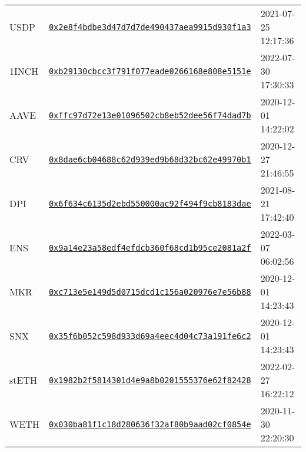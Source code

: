 \begin{tabular}{lll}
 USDP & \href{https://etherscan.io/address/0x2e8f4bdbe3d47d7d7de490437aea9915d930f1a3}{\tt 0x2e8f4bdbe3d47d7d7de490437aea9915d930f1a3} &      2021-07-25 12:17:36 \\
1INCH & \href{https://etherscan.io/address/0xb29130cbcc3f791f077eade0266168e808e5151e}{\tt 0xb29130cbcc3f791f077eade0266168e808e5151e} &      2022-07-30 17:30:33 \\
 AAVE & \href{https://etherscan.io/address/0xffc97d72e13e01096502cb8eb52dee56f74dad7b}{\tt 0xffc97d72e13e01096502cb8eb52dee56f74dad7b} &      2020-12-01 14:22:02 \\
  CRV & \href{https://etherscan.io/address/0x8dae6cb04688c62d939ed9b68d32bc62e49970b1}{\tt 0x8dae6cb04688c62d939ed9b68d32bc62e49970b1} &      2020-12-27 21:46:55 \\
  DPI & \href{https://etherscan.io/address/0x6f634c6135d2ebd550000ac92f494f9cb8183dae}{\tt 0x6f634c6135d2ebd550000ac92f494f9cb8183dae} &      2021-08-21 17:42:40 \\
  ENS & \href{https://etherscan.io/address/0x9a14e23a58edf4efdcb360f68cd1b95ce2081a2f}{\tt 0x9a14e23a58edf4efdcb360f68cd1b95ce2081a2f} &      2022-03-07 06:02:56 \\
  MKR & \href{https://etherscan.io/address/0xc713e5e149d5d0715dcd1c156a020976e7e56b88}{\tt 0xc713e5e149d5d0715dcd1c156a020976e7e56b88} &      2020-12-01 14:23:43 \\
  SNX & \href{https://etherscan.io/address/0x35f6b052c598d933d69a4eec4d04c73a191fe6c2}{\tt 0x35f6b052c598d933d69a4eec4d04c73a191fe6c2} &      2020-12-01 14:23:43 \\
stETH & \href{https://etherscan.io/address/0x1982b2f5814301d4e9a8b0201555376e62f82428}{\tt 0x1982b2f5814301d4e9a8b0201555376e62f82428} &      2022-02-27 16:22:12 \\
 WETH & \href{https://etherscan.io/address/0x030ba81f1c18d280636f32af80b9aad02cf0854e}{\tt 0x030ba81f1c18d280636f32af80b9aad02cf0854e} &      2020-11-30 22:20:30 \\
\bottomrule
\end{tabular}
